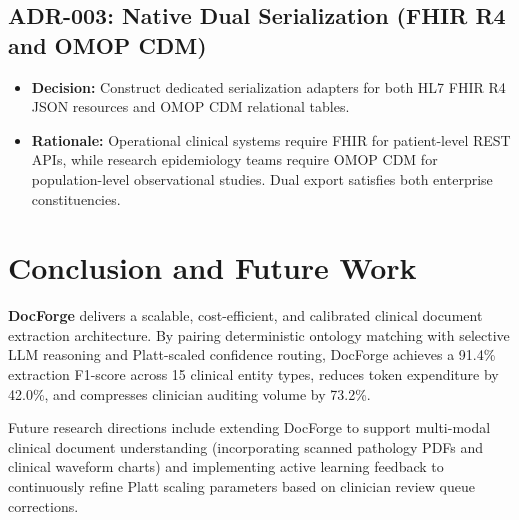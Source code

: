 \documentclass[10pt,journal,compsoc]{IEEEtran}
\begin{document}
\subsection{ADR-003: Native Dual Serialization (FHIR R4 and OMOP CDM)}
\begin{itemize}
    \item \textbf{Decision:} Construct dedicated serialization adapters for both HL7 FHIR R4 JSON resources and OMOP CDM relational tables.
    \item \textbf{Rationale:} Operational clinical systems require FHIR for patient-level REST APIs, while research epidemiology teams require OMOP CDM for population-level observational studies. Dual export satisfies both enterprise constituencies.
\end{itemize}

\section{Conclusion and Future Work}
\textbf{DocForge} delivers a scalable, cost-efficient, and calibrated clinical document extraction architecture. By pairing deterministic ontology matching with selective LLM reasoning and Platt-scaled confidence routing, DocForge achieves a 91.4\% extraction F1-score across 15 clinical entity types, reduces token expenditure by 42.0\%, and compresses clinician auditing volume by 73.2\%.

Future research directions include extending DocForge to support multi-modal clinical document understanding (incorporating scanned pathology PDFs and clinical waveform charts) and implementing active learning feedback to continuously refine Platt scaling parameters based on clinician review queue corrections.
\end{document}

